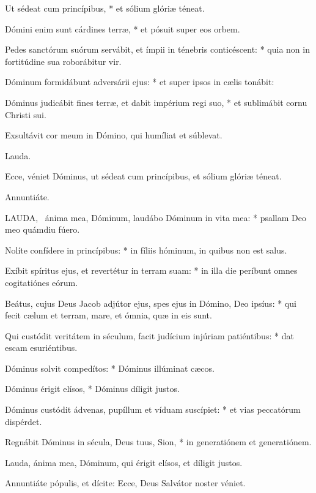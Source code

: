 Ut sédeat cum princípibus, * et sólium glóriæ téneat.

Dómini enim sunt cárdines terræ, * et pósuit super eos orbem.

Pedes sanctórum suórum servábit, et ímpii in ténebris conticéscent: * quia non in fortitúdine sua roborábitur vir.

Dóminum formidábunt adversárii ejus: * et super ipsos in cælis tonábit:

Dóminus judicábit fines terræ, et dabit impérium regi suo, * et sublimábit cornu Christi sui.

 Exsultávit cor meum in Dómino, qui humíliat et súblevat.

 Lauda. \textdagger

  Ecce, véniet Dóminus, ut sédeat cum princípibus, et sólium glóriæ téneat.

 Annuntiáte.


\lettrine[lines=2]{L}{AUDA}, \textdagger\ ánima mea, Dóminum, laudábo Dóminum in vita mea: * psallam Deo meo quámdiu fúero.

Nolíte confídere in princípibus: * in fíliis hóminum, in quibus non est salus.

Exíbit spíritus ejus, et revertétur in terram suam: * in illa die períbunt omnes cogitatiónes eórum.

Beátus, cujus Deus Jacob adjútor ejus, spes ejus in Dómino, Deo ipsíus: * qui fecit cælum et terram, mare, et ómnia, quæ in eis sunt.

Qui custódit veritátem in séculum, facit judícium injúriam patiéntibus: * dat escam esuriéntibus.

Dóminus solvit compedítos: * Dóminus illúminat cæcos.

Dóminus érigit elísos, * Dóminus díligit justos.

Dóminus custódit ádvenas, pupíllum et víduam suscípiet: * et vias peccatórum dispérdet.

Regnábit Dóminus in sécula, Deus tuus, Sion, * in generatiónem et generatiónem.

 Lauda, ánima mea, Dóminum, qui érigit elísos, et díligit justos.

  Annuntiáte pópulis, et dícite: Ecce, Deus Salvátor noster véniet.


